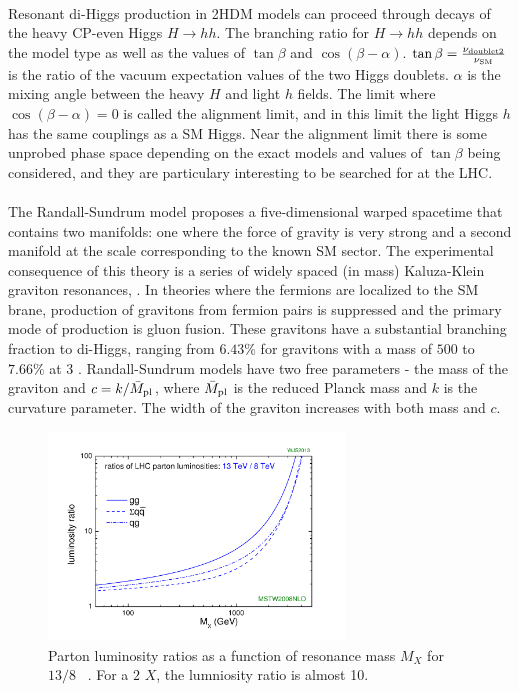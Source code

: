 \paragraph{}
Resonant di-Higgs production in 2HDM models can proceed through decays of the heavy CP-even Higgs $H\to hh$. The branching ratio for $H\to hh$ depends on the model type as well as the values of $\tan{\beta}$ and $\cos(\beta - \alpha)$. $\tan{\beta} = \frac{\rm \nu_{\rm doublet2}}{\rm \nu_{SM}}$ is the ratio of the vacuum expectation values of the two Higgs doublets. $\alpha$ is the mixing angle between the heavy $H$ and light $h$ fields. The limit where $\cos(\beta - \alpha) = 0$ is called the alignment limit, and in this limit the light Higgs $h$ has the same couplings as a SM Higgs. Near the alignment limit there is some unprobed phase space depending on the exact models and values of $\tan{\beta}$ being considered, and they are particulary interesting to be searched for at the LHC.


\paragraph{}
The Randall-Sundrum model proposes a five-dimensional warped spacetime that contains two manifolds: one where the force of gravity is very strong and a second manifold at the \TeV scale corresponding to the known SM sector. The experimental consequence of this theory is a series of widely spaced (in mass) Kaluza-Klein graviton resonances, \Grav. In theories where the fermions are localized to the SM brane, production of gravitons from fermion pairs is suppressed and the primary mode of production is gluon fusion. These gravitons have a substantial branching fraction to di-Higgs, ranging from $6.43$\% for gravitons with a mass of $500$ \GeV to $7.66\%$ at $3$ \TeV. Randall-Sundrum models have two free parameters - the mass of the graviton and $c = k/\bar{M}_{\rm pl}$, where $\bar{M}_{\rm pl}$ is the reduced Planck mass and $k$ is the curvature parameter. The width of the graviton increases with both mass and $c$.

\begin{figure}[h!]
  \centering
  \captionsetup{justification=centering}
  \includegraphics[width=0.7\textwidth,angle=270]{figures/theory/lhclumi7813_2013_v1.pdf}
  \caption{Parton luminosity ratios as a function of resonance mass $M_{X}$ for $13/8$ \TeV~\cite{LumiRatio}. For a $2$ \TeV $X$, the lumniosity ratio is almost 10.}
  \label{fig:lumi_ratio}
\end{figure}

